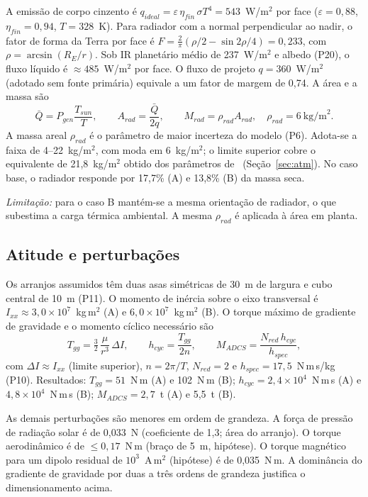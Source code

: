 \documentclass[11pt,a4paper]{article}
\begin{document}
A emissão de corpo cinzento é
$q_{ideal}=\varepsilon\,\eta_{fin}\,\sigma T^{4}=543$~W/m$^2$ por face
($\varepsilon=0{,}88$, $\eta_{fin}=0{,}94$, $T=328$~K). Para radiador com a
normal perpendicular ao nadir, o fator de forma da Terra por face é
$F=\tfrac{2}{\pi}\left(\rho/2-\sin 2\rho/4\right)=0{,}233$, com
$\rho=\arcsin(R_E/r)$. Sob IR planetário médio de 237~W/m$^2$ e albedo (P20), o
fluxo líquido é $\approx 485$~W/m$^2$ por face. O fluxo de projeto
$q=360$~W/m$^2$ (adotado sem fonte primária) equivale a um fator de margem de
0,74. A área e a massa são
\begin{equation}
  \bar Q=P_{gen}\frac{T_{sun}}{T},\qquad
  A_{rad}=\frac{\bar Q}{2q},\qquad
  M_{rad}=\rho_{rad}A_{rad},\quad \rho_{rad}=6~\text{kg/m}^2 .
  \label{eq:rad}
\end{equation}
A massa areal $\rho_{rad}$ é o parâmetro de maior incerteza do modelo (P6).
Adota-se a faixa de 4--22~kg/m$^2$, com moda em 6~kg/m$^2$; o limite superior
cobre o equivalente de 21,8~kg/m$^2$ obtido dos parâmetros de~\cite{r19}
(Seção~\ref{sec:atm}). No caso base, o radiador responde por 17,7\% (A) e
13,8\% (B) da massa seca.

\emph{Limitação:} para o caso B mantém-se a mesma orientação de radiador, o que
subestima a carga térmica ambiental. A mesma $\rho_{rad}$ é aplicada à área em
planta.

\subsection{Atitude e perturbações}

Os arranjos assumidos têm duas asas simétricas de 30~m de largura e cubo central
de 10~m (P11). O momento de inércia sobre o eixo transversal é
$I_{xx}\approx 3{,}0\times10^{7}$~kg\,m$^2$ (A) e $6{,}0\times10^{7}$~kg\,m$^2$
(B). O torque máximo de gradiente de gravidade e o momento cíclico necessário
são
\begin{equation}
  T_{gg}=\tfrac32\,\frac{\mu}{r^{3}}\,\Delta I,\qquad
  h_{cyc}=\frac{T_{gg}}{2n},\qquad
  M_{ADCS}=\frac{N_{red}\,h_{cyc}}{h_{spec}},
  \label{eq:adcs}
\end{equation}
com $\Delta I\approx I_{xx}$ (limite superior), $n=2\pi/T$, $N_{red}=2$ e
$h_{spec}=17{,}5$~N\,m\,s/kg (P10). Resultados: $T_{gg}=51$~N\,m (A) e 102~N\,m
(B); $h_{cyc}=2{,}4\times10^{4}$~N\,m\,s (A) e $4{,}8\times10^{4}$~N\,m\,s (B);
$M_{ADCS}=2{,}7$~t (A) e 5,5~t (B).

As demais perturbações são menores em ordem de grandeza. A força de pressão de
radiação solar é de 0,033~N (coeficiente de 1,3; área do arranjo). O torque
aerodinâmico é de $\le 0{,}17$~N\,m (braço de 5~m, hipótese). O torque magnético
para um dipolo residual de $10^{3}$~A\,m$^2$ (hipótese) é de 0,035~N\,m. A
dominância do gradiente de gravidade por duas a três ordens de grandeza
justifica o dimensionamento acima.
\end{document}
